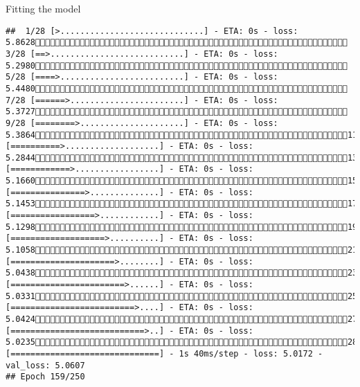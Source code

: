 \documentclass[
  ignorenonframetext,
]{beamer}
\begin{document}
\begin{frame}[fragile]{Fitting the model}
\begin{verbatim}
##  1/28 [>.............................] - ETA: 0s - loss: 5.8628 3/28 [==>...........................] - ETA: 0s - loss: 5.2980 5/28 [====>.........................] - ETA: 0s - loss: 5.4480 7/28 [======>.......................] - ETA: 0s - loss: 5.3727 9/28 [========>.....................] - ETA: 0s - loss: 5.386411/28 [==========>...................] - ETA: 0s - loss: 5.284413/28 [============>.................] - ETA: 0s - loss: 5.166015/28 [===============>..............] - ETA: 0s - loss: 5.145317/28 [=================>............] - ETA: 0s - loss: 5.129819/28 [===================>..........] - ETA: 0s - loss: 5.105821/28 [=====================>........] - ETA: 0s - loss: 5.043823/28 [=======================>......] - ETA: 0s - loss: 5.033125/28 [=========================>....] - ETA: 0s - loss: 5.042427/28 [===========================>..] - ETA: 0s - loss: 5.023528/28 [==============================] - 1s 40ms/step - loss: 5.0172 - val_loss: 5.0607
## Epoch 159/250

\end{verbatim}
\end{frame}
\end{document}
